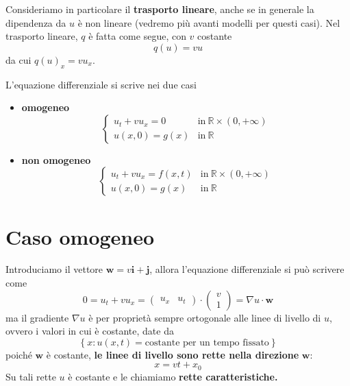 Consideriamo in particolare il \textbf{trasporto lineare}, anche se in generale la dipendenza da $u$ è non lineare (vedremo più avanti modelli per questi casi). Nel trasporto lineare, $q$ è fatta come segue, con $v$ costante
\begin{equation}
    q(u) =vu
\end{equation}
da cui $q(u)_{x} =vu_{x}$.

L'equazione differenziale si scrive nei due casi
\begin{itemize}
    \item \textbf{omogeneo}
          \begin{equation*}
              \begin{cases}
                  u_{t} +vu_{x} =\boxed{0} & \text{in} \ \mathbb{R} \times (0,+\infty) \\
                  u(x,0) =g(x)             & \text{in} \ \mathbb{R}
              \end{cases}
          \end{equation*}
    \item \textbf{non omogeneo}
          \begin{equation*}
              \begin{cases}
                  u_{t} +vu_{x} =\boxed{f(x,t)} & \text{in} \ \mathbb{R} \times (0,+\infty) \\
                  u(x,0) =g(x)                  & \text{in} \ \mathbb{R}
              \end{cases}
          \end{equation*}
\end{itemize}
\section{Caso omogeneo}

Introduciamo il vettore $\mathbf{w} =v\mathbf{i} +\mathbf{j}$, allora l'equazione differenziale si può scrivere come
\begin{equation*}
    0=u_{t} +vu_{x} =
    \begin{pmatrix}
        u_{x} & u_{t}
    \end{pmatrix} \cdotp \begin{pmatrix}
        v \\
        1
    \end{pmatrix} =\nabla u\cdotp \mathbf{w}
\end{equation*}
ma il gradiente $\nabla u$ è per proprietà sempre ortogonale alle linee di livello di $u$, ovvero i valori in cui è costante, date da
\begin{equation*}
    \left\{x:u(x,t) =\text{costante per un tempo fissato}\right\}
\end{equation*}
poiché $\mathbf{w}$ è costante, \textbf{le linee di livello sono rette nella direzione} $\mathbf{w}$:
\begin{equation}
    x=vt+x_{0}
\end{equation}
Su tali rette $u$ è costante e le chiamiamo \textbf{rette caratteristiche.}

